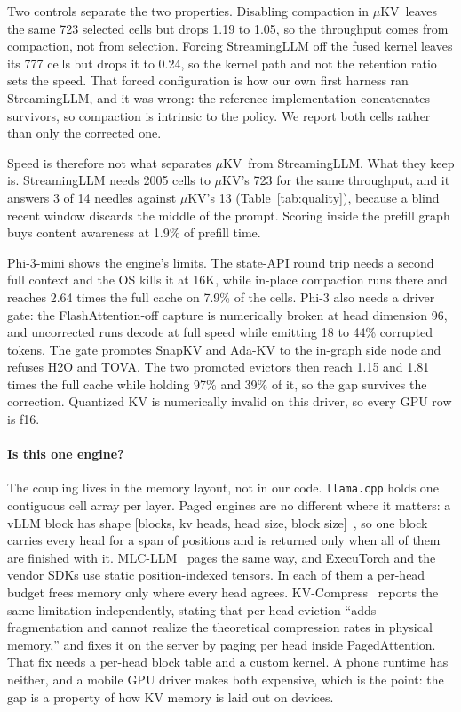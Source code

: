 \documentclass[sigconf, anonymous=false, screen=true, 10pt]{acmart}
\newcommand{\muKV}{$\mu$KV}
\begin{document}
Two controls separate the two properties. Disabling compaction in \muKV\ leaves the same 723 selected cells but drops 1.19 to 1.05, so the throughput comes from compaction, not from selection. Forcing StreamingLLM off the fused kernel leaves its 777 cells but drops it to 0.24, so the kernel path and not the retention ratio sets the speed. That forced configuration is how our own first harness ran StreamingLLM, and it was wrong: the reference implementation concatenates survivors, so compaction is intrinsic to the policy. We report both cells rather than only the corrected one.

Speed is therefore not what separates \muKV\ from StreamingLLM. What they keep is. StreamingLLM needs 2005 cells to \muKV's 723 for the same throughput, and it answers 3 of 14 needles against \muKV's 13 (Table~\ref{tab:quality}), because a blind recent window discards the middle of the prompt. Scoring inside the prefill graph buys content awareness at 1.9\% of prefill time.

Phi-3-mini shows the engine's limits. The state-API round trip needs a second full context and the OS kills it at 16K, while in-place compaction runs there and reaches 2.64 times the full cache on 7.9\% of the cells. Phi-3 also needs a driver gate: the FlashAttention-off capture is numerically broken at head dimension 96, and uncorrected runs decode at full speed while emitting 18 to 44\% corrupted tokens. The gate promotes SnapKV and Ada-KV to the in-graph side node and refuses H2O and TOVA. The two promoted evictors then reach 1.15 and 1.81 times the full cache while holding 97\% and 39\% of it, so the gap survives the correction. Quantized KV is numerically invalid on this driver, so every GPU row is f16.

\paragraph{Is this one engine?} The coupling lives in the memory layout, not in our code. \texttt{llama.cpp} holds one contiguous cell array per layer. Paged engines are no different where it matters: a vLLM block has shape [blocks, kv heads, head size, block size]~\cite{kwon2023vllm}, so one block carries every head for a span of positions and is returned only when all of them are finished with it. MLC-LLM~\cite{mlcllm} pages the same way, and ExecuTorch and the vendor SDKs use static position-indexed tensors. In each of them a per-head budget frees memory only where every head agrees. KV-Compress~\cite{rehg2024kvcompress} reports the same limitation independently, stating that per-head eviction ``adds fragmentation and cannot realize the theoretical compression rates in physical memory,'' and fixes it on the server by paging per head inside PagedAttention. That fix needs a per-head block table and a custom kernel. A phone runtime has neither, and a mobile GPU driver makes both expensive, which is the point: the gap is a property of how KV memory is laid out on devices.
\end{document}
